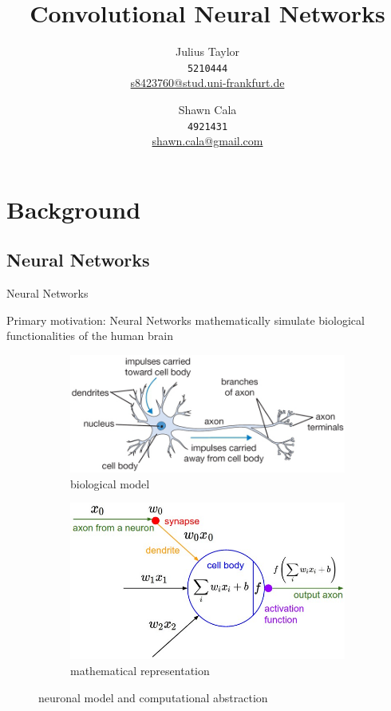 \documentclass[12pt]{beamer}
\title{Convolutional Neural Networks}
\author{
\linebreak
Julius Taylor \\ \texttt{5210444} \\ \href{mailto:s8423760@stud.uni-frankfurt.de}{s8423760@stud.uni-frankfurt.de}
 \and   
 \linebreak
Shawn Cala \\ \texttt{4921431} \\ \href{mailto:shawn.cala@gmail.com}{shawn.cala@gmail.com}
}
\begin{document}
\begin{frame}
\titlepage
\end{frame}
\section{Background}
\subsection{Neural Networks}
\begin{frame}{Neural Networks}

Primary motivation: Neural Networks mathematically simulate biological functionalities of the human brain
\begin{figure}
\begin{subfigure}{.5\textwidth}
  \centering
  \includegraphics[width=\linewidth,height=0.35\textheight]{images/neuron.png}
  \caption{biological model}
  \label{fig:sub1}
\end{subfigure}%
\begin{subfigure}{.5\textwidth}
  \centering
  \includegraphics[width=\linewidth,height=0.35\textheight]{images/neuron_model.jpeg}
  \caption{mathematical representation}
  \label{fig:sub2}
\end{subfigure}
\caption{neuronal model and computational abstraction}
\label{fig:abstract}
\end{figure}

\end{frame}
\end{document}
